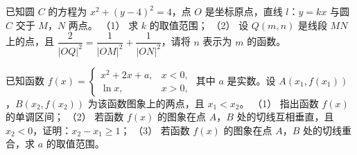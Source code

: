 \begin{question}
已知圆 $C$ 的方程为 $x^2+(y-4)^2=4$，点 $O$ 是坐标原点，直线 $l$：$y=kx$ 与圆 $C$ 交于 $M$，$N$ 两点。
（1） 求 $k$ 的取值范围；
（2） 设 $Q(m,n)$ 是线段 $MN$ 上的点，且 $\dfrac2{|OQ|^2}=\dfrac1{|OM|^2}+\dfrac1{|ON|^2}$，请将 $n$ 表示为 $m$ 的函数。
\end{question}
\begin{question}
已知函数 $f(x)=\begin{cases}x^2+2x+a,&x<0,\\[2pt] \ln x,&x>0,\end{cases}$ 其中 $a$ 是实数。设 $A(x_1,f(x_1))$，$B(x_2,f(x_2))$ 为该函数图象上的两点，且 $x_1<x_2$。
（1） 指出函数 $f(x)$ 的单调区间；
（2） 若函数 $f(x)$ 的图象在点 $A$，$B$ 处的切线互相垂直，且 $x_2<0$，证明：$x_2-x_1\geqslant1$；
（3） 若函数 $f(x)$ 的图象在点 $A$，$B$ 处的切线重合，求 $a$ 的取值范围。

\end{question}